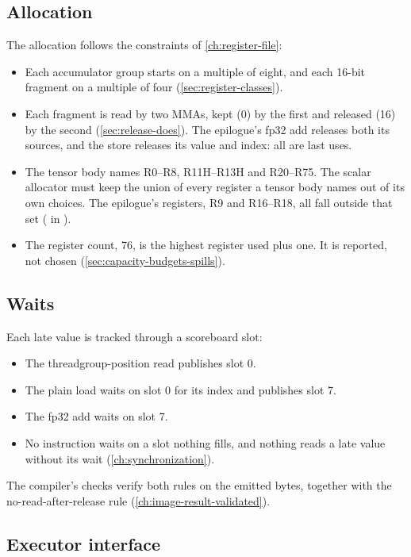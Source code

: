 \subsection*{Allocation}

The allocation follows the constraints of \cref{ch:register-file}:

\begin{itemize}
\item Each accumulator group starts on a multiple of eight, and each 16-bit fragment on a multiple of four
  (\cref{sec:register-classes}).
\item Each fragment is read by two MMAs, kept (0) by the first and released (16) by the second
  (\cref{sec:release-does}). The epilogue's fp32 add releases both its sources, and the store releases its value and index: all
  are last uses.
\item The tensor body names R0–R8, R11H–R13H and R20–R75. The scalar allocator must keep the union of
  every register a tensor body names out of its own choices. The epilogue's registers, R9 and R16–R18, all fall
  outside that set ( in ).
\item The register count, 76, is the highest register used plus one. It is reported, not chosen (\cref{sec:capacity-budgets-spills}).
\end{itemize}

\subsection*{Waits}

Each late value is tracked through a scoreboard slot:

\begin{itemize}
\item The threadgroup-position read publishes slot 0.
\item The plain load waits on slot 0 for its index and publishes slot 7.
\item The fp32 add waits on slot 7.
\item No instruction waits on a slot nothing fills, and nothing reads a late value without its wait (\cref{ch:synchronization}).
\end{itemize}

The compiler's checks verify both rules on the emitted bytes, together with the no-read-after-release rule
(\cref{ch:image-result-validated}).

\subsection*{Executor interface}

